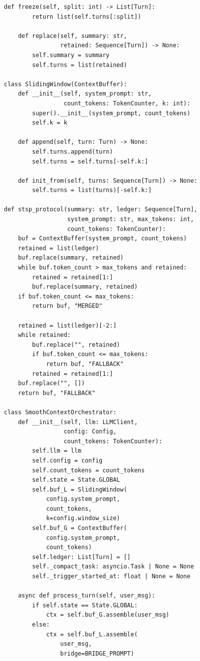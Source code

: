 \documentclass[10pt,twocolumn]{article}
\newcommand{\sys}{\textsc{SmoothContext}}
\begin{document}
\begin{lstlisting}[style=python, caption={Core \sys{} orchestrator implementation.}, label={lst:impl}]
    def freeze(self, split: int) -> List[Turn]:
        return list(self.turns[:split])

    def replace(self, summary: str,
                retained: Sequence[Turn]) -> None:
        self.summary = summary
        self.turns = list(retained)

class SlidingWindow(ContextBuffer):
    def __init__(self, system_prompt: str,
                 count_tokens: TokenCounter, k: int):
        super().__init__(system_prompt, count_tokens)
        self.k = k

    def append(self, turn: Turn) -> None:
        self.turns.append(turn)
        self.turns = self.turns[-self.k:]

    def init_from(self, turns: Sequence[Turn]) -> None:
        self.turns = list(turns)[-self.k:]

def stsp_protocol(summary: str, ledger: Sequence[Turn],
                  system_prompt: str, max_tokens: int,
                  count_tokens: TokenCounter):
    buf = ContextBuffer(system_prompt, count_tokens)
    retained = list(ledger)
    buf.replace(summary, retained)
    while buf.token_count > max_tokens and retained:
        retained = retained[1:]
        buf.replace(summary, retained)
    if buf.token_count <= max_tokens:
        return buf, "MERGED"

    retained = list(ledger)[-2:]
    while retained:
        buf.replace("", retained)
        if buf.token_count <= max_tokens:
            return buf, "FALLBACK"
        retained = retained[1:]
    buf.replace("", [])
    return buf, "FALLBACK"

class SmoothContextOrchestrator:
    def __init__(self, llm: LLMClient,
                 config: Config,
                 count_tokens: TokenCounter):
        self.llm = llm
        self.config = config
        self.count_tokens = count_tokens
        self.state = State.GLOBAL
        self.buf_L = SlidingWindow(
            config.system_prompt,
            count_tokens,
            k=config.window_size)
        self.buf_G = ContextBuffer(
            config.system_prompt,
            count_tokens)
        self.ledger: List[Turn] = []
        self._compact_task: asyncio.Task | None = None
        self._trigger_started_at: float | None = None

    async def process_turn(self, user_msg):
        if self.state == State.GLOBAL:
            ctx = self.buf_G.assemble(user_msg)
        else:
            ctx = self.buf_L.assemble(
                user_msg,
                bridge=BRIDGE_PROMPT)


\end{lstlisting}
\end{document}
